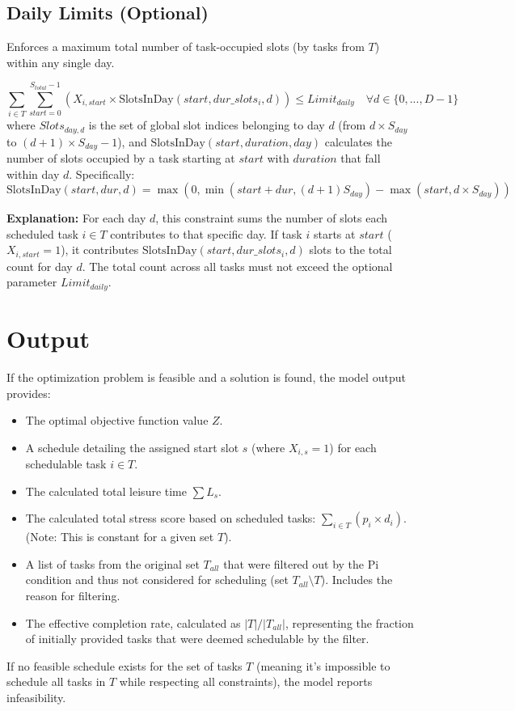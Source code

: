 \documentclass{article}
\begin{document}
\subsection{Daily Limits (Optional)}
Enforces a maximum total number of task-occupied slots (by tasks from $T$) within any single day.

\[
\sum_{i \in T} \sum_{start=0}^{S_{total}-1} \left( X_{i,start} \times \text{SlotsInDay}(start, dur\_slots_i, d) \right) \le Limit_{daily} \quad \forall d \in \{0, ..., D-1\}
\]
where $Slots_{day, d}$ is the set of global slot indices belonging to day $d$ (from $d \times S_{day}$ to $(d+1) \times S_{day} - 1$), and $\text{SlotsInDay}(start, duration, day)$ calculates the number of slots occupied by a task starting at $start$ with $duration$ that fall within day $d$. Specifically:
\[ \text{SlotsInDay}(start, dur, d) = \max(0, \min(start + dur, (d+1)S_{day}) - \max(start, d \times S_{day})) \]

\textbf{Explanation:} For each day $d$, this constraint sums the number of slots each scheduled task $i \in T$ contributes to that specific day. If task $i$ starts at $start$ ($X_{i,start}=1$), it contributes $\text{SlotsInDay}(start, dur\_slots_i, d)$ slots to the total count for day $d$. The total count across all tasks must not exceed the optional parameter $Limit_{daily}$.

\section{Output}

If the optimization problem is feasible and a solution is found, the model output provides:
\begin{itemize}
    \item The optimal objective function value $Z$.
    \item A schedule detailing the assigned start slot $s$ (where $X_{i,s}=1$) for each schedulable task $i \in T$.
    \item The calculated total leisure time $\sum L_s$.
    \item The calculated total stress score based on scheduled tasks: $\sum_{i \in T} (p_i \times d_i)$. (Note: This is constant for a given set $T$).
    \item A list of tasks from the original set $T_{all}$ that were filtered out by the Pi condition and thus not considered for scheduling (set $T_{all} \setminus T$). Includes the reason for filtering.
    \item The effective completion rate, calculated as $|T| / |T_{all}|$, representing the fraction of initially provided tasks that were deemed schedulable by the filter.
\end{itemize}
If no feasible schedule exists for the set of tasks $T$ (meaning it's impossible to schedule all tasks in $T$ while respecting all constraints), the model reports infeasibility.
\end{document}
